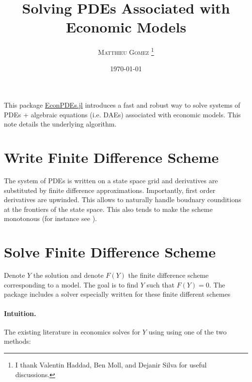 \documentclass[english]{article}
\begin{document}
	\title{Solving PDEs Associated with Economic Models}
	\author{\large{\textsc{Matthieu Gomez \thanks{I thank Valentin Haddad, Ben Moll, and Dejanir Silva for useful discussions.}}}}
	\date{\today}
	\maketitle
	This package \href{https://github.com/matthieugomez/EconPDEs.jl}{EconPDEs.jl} introduces a fast and robust way to solve systems of PDEs + algebraic equations (i.e. DAEs) associated with economic models. This note details the underlying algorithm. 


\section{Write Finite Difference Scheme}
	The system of PDEs is written on a state space grid and derivatives are substituted by finite difference approximations. Importantly, first order derivatives are upwinded. This allows to naturally handle boudnary counditions at the frontiers of the state space. This also tends to make the scheme monotonous (for instance see \citet{achdou2014heterogeneous}). 
\section{Solve Finite Difference Scheme}
				
Denote $Y$  the solution and denote $F(Y)$ the finite difference scheme corresponding to a model. The goal is to find $Y$ such that $F(Y) = 0$. The package includes a solver especially written for these finite different schemes

\paragraph{Intuition.}
The existing literature in economics solves for $Y$ using using one of the two methods:
\end{document}
